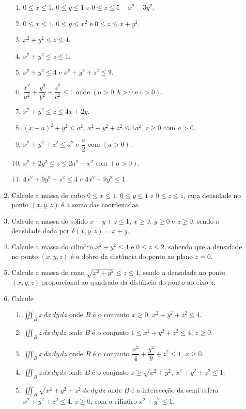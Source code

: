\documentclass[11pt,a4paper]{article}
\begin{document}
\begin{enumerate}
\begin{enumerate}
\item $0 \leq x \leq 1$, $0 \leq y \leq 1$ e $0 \leq z \leq 5 - x^2 - 3y^2$.
\item $0 \leq x \leq 1$, $0 \leq y \leq x^2$ e $0 \leq z \leq x + y^2$.
\item $x^2 + y^2 \leq z \leq 4$.
\item $x^2 + y^2 \leq z \leq 1$.
\item $x^2 + y^2 \leq 4$ e $x^2 + y^2 + z^2 \leq 9$.
\item $\dfrac{x^2}{a^2} + \dfrac{y^2}{b^2} + \dfrac{z^2}{c^2} \leq 1$ onde $(a > 0 \textrm{,}\ b > 0 \textrm{ e}\ c > 0)$.
\item $x^2 + y^2 \leq z \leq 4x + 2y$.
\item $(x-a)^2 + y^2 \leq a^2$, $x^2 + y^2 + z^2 \leq 4a^2$, $z \geq 0$ com $a > 0$.
\item $x^2 + y^2 + z^2 \leq a^2$ e $\dfrac{a}{2}$ com $(a > 0)$.
\item $x^2 + 2y^2 \leq z \leq 2a^2 - x^2$ com $(a > 0)$.
\item $4x^2 + 9y^2 + z^2 \leq 4$ e $4x^2 + 9y^2 \leq 1$.

\end{enumerate}

\item Calcule a massa do cubo $0 \leq x \leq 1$, $0 \leq y \leq 1$ e $0 \leq z \leq 1$, cuja densidade no ponto $(x,y,z)$ é a soma das coordenadas.

\item Calcule a massa do sólido $x + y + z \leq 1$, $x \geq 0$, $y \geq 0$ e $z \geq 0$, sendo a densidade dada por $\delta (x,y,z) = x + y$.

\item Calcule a massa do cilindro $x^2 + y^2 \leq 4$ e $0 \leq z \leq 2$, sabendo que a densidade no ponto $(x,y,z)$ é o dobro da distância do ponto ao plano $z = 0$.

\item Calcule a massa do cone $\sqrt{x^2 + y^2} \leq z \leq 1$, sendo a densidade no ponto $(x, y, z)$ proporcional ao quadrado da distância do ponto ao eixo $z$.

\item Calcule

\begin{enumerate}

\item $\displaystyle\iiint_B x \,dx\,dy\,dz$ onde $B$ é o conjunto $x \geq 0$, $x^2 + y^2 + z^2 \leq 4$.
\item $\displaystyle\iiint_B z \,dx\,dy\,dz$ onde $B$ é o conjunto $1 \leq x^2 + y^2 + z^2 \leq 4$, $z \geq 0$.
\item $\displaystyle\iiint_B x \,dx\,dy\,dz$ onde $B$ é o conjunto $\dfrac{x^2}{4} + \dfrac{y^2}{9} + z^2 \leq 1$, $x \geq 0$.
\item $\displaystyle\iiint_B z \,dx\,dy\,dz$ onde $B$ é o conjunto $z \geq \sqrt{x^2 + y^2}$, $x^2 + y^2 + z^2 \leq 1$.
\item $\displaystyle\iiint_B \sqrt{x^2 + y^2 + z^2} \,dx\,dy\,dz$ onde $B$ é a intersecção da semi-esfera $x^2 + y^2 + z^2 \leq 4$, $z \geq 0$, com o cilindro $x^2 + y^2 \leq 1$.


\end{enumerate}
\end{enumerate}
\end{document}
